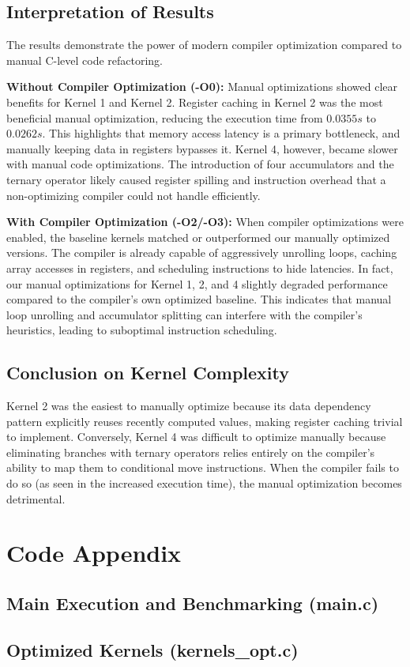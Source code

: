 \documentclass[11pt,a4paper]{article}
\begin{document}
\subsection{Interpretation of Results}
The results demonstrate the power of modern compiler optimization compared to manual C-level code refactoring. 

\textbf{Without Compiler Optimization (-O0):} Manual optimizations showed clear benefits for Kernel 1 and Kernel 2. Register caching in Kernel 2 was the most beneficial manual optimization, reducing the execution time from $0.0355s$ to $0.0262s$. This highlights that memory access latency is a primary bottleneck, and manually keeping data in registers bypasses it. Kernel 4, however, became slower with manual code optimizations. The introduction of four accumulators and the ternary operator likely caused register spilling and instruction overhead that a non-optimizing compiler could not handle efficiently.

\textbf{With Compiler Optimization (-O2/-O3):} When compiler optimizations were enabled, the baseline kernels matched or outperformed our manually optimized versions. The compiler is already capable of aggressively unrolling loops, caching array accesses in registers, and scheduling instructions to hide latencies. In fact, our manual optimizations for Kernel 1, 2, and 4 slightly degraded performance compared to the compiler's own optimized baseline. This indicates that manual loop unrolling and accumulator splitting can interfere with the compiler's heuristics, leading to suboptimal instruction scheduling.

\subsection{Conclusion on Kernel Complexity}
Kernel 2 was the easiest to manually optimize because its data dependency pattern explicitly reuses recently computed values, making register caching trivial to implement. Conversely, Kernel 4 was difficult to optimize manually because eliminating branches with ternary operators relies entirely on the compiler's ability to map them to conditional move instructions. When the compiler fails to do so (as seen in the increased execution time), the manual optimization becomes detrimental.

\newpage
\appendix
\section{Code Appendix}

\subsection{Main Execution and Benchmarking (main.c)}


\subsection{Optimized Kernels (kernels\_opt.c)}

\end{document}
